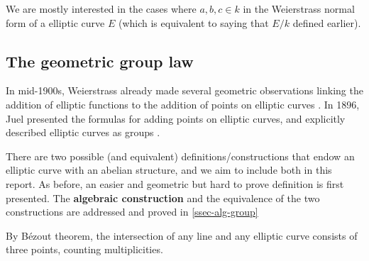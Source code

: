 \documentclass[12pt]{article}
\theoremstyle{remark}
\theoremstyle{definition}
\newcommand{\F}[0]{\mathbb{F}}
\newcommand{\comment}[1]{}
\begin{document}
        We are mostly interested in the cases where $a,b,c\in k$ in the Weierstrass normal form of a elliptic curve $E$ (which is equivalent to saying that $E/k$ defined earlier).
        \comment{
        Therefore, $P + Q$ becomes the      reflection point of $P * Q$ about $x$-axis. And $-Q$ is simply reflection point of $Q$ about        $x$-axis.\\
        Simple algebra yields the explicit formulae for $P * Q$: if $P = (x_1, y_1), \; Q = (x_2, y_2)$       and $P * Q = (x_3, y_3)$, then 
        $$x_3 = \lambda^2 - a - x_1 - x_2, \; y_3 = \lambda x_3 + \nu$$
        where $\lambda = \frac{y_2 - y_1}{x_2 - x_1}, \nu = y_1 - \lambda x_1 = y_2 - \lambda x_2$ make        sure that $y = \lambda x + \nu$ is equation of the line joining $P, Q$. This explicit formulae       generalises to finite field $\F_p$ where geometric definition of group law is not possible. If         $P = Q$, $\lambda$ is the tangent at $P$ instead, which is
        $$\lambda = \left.\frac{dy}{dx}\right|_{P_0} = \frac{f'(x_0)}{2y_0}$$  
        to get $P + Q$, simply take $(x_3, -y_3)$. }
        
    
     \subsection{The geometric group law}
        In mid-1900s, Weierstrass already made several geometric observations linking the addition of elliptic functions to the addition of points on elliptic curves \cite{conifold_2016_who}. In 1896, Juel presented the formulas for adding points on elliptic curves, and explicitly described elliptic curves as groups \cite{Juel1896}.
        
        There are two possible (and equivalent) definitions/constructions that endow an elliptic curve with an abelian structure, and we aim to include both in this report. As before, an easier and geometric but hard to prove definition is first presented. The \textbf{algebraic construction} and the equivalence of the two constructions are addressed and proved in \autoref{ssec-alg-group}

        By Bézout theorem, the intersection of any line and any elliptic curve consists of three points, counting multiplicities.
        
\end{document}
